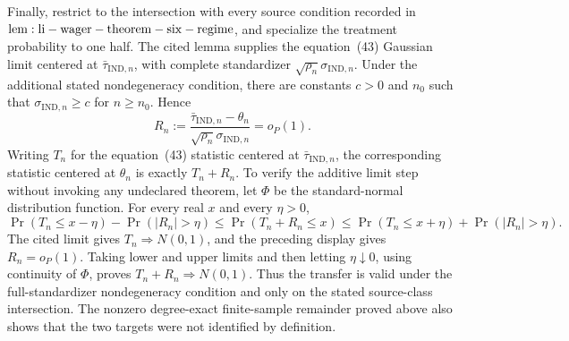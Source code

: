 Finally, restrict to the intersection with every source condition recorded in \({\rm lem:li-wager-theorem-six-regime}\), and specialize the treatment probability to one half.  The cited lemma supplies the equation~(43) Gaussian limit centered at \(\bar\tau_{\mathrm{IND},n}\), with complete standardizer \(\sqrt{\rho_n}\sigma_{\mathrm{IND},n}\).  Under the additional stated nondegeneracy condition, there are constants \(c>0\) and \(n_0\) such that \(\sigma_{\mathrm{IND},n}\ge c\) for \(n\ge n_0\).  Hence
\[
 R_n:=\frac{\bar\tau_{\mathrm{IND},n}-\theta_n}
 {\sqrt{\rho_n}\sigma_{\mathrm{IND},n}}=o_P(1).
\]
Writing \(T_n\) for the equation~(43) statistic centered at \(\bar\tau_{\mathrm{IND},n}\), the corresponding statistic centered at \(\theta_n\) is exactly \(T_n+R_n\).  To verify the additive limit step without invoking any undeclared theorem, let \(\Phi\) be the standard-normal distribution function.  For every real \(x\) and every \(\eta>0\),
\[
 \Pr(T_n\le x-\eta)-\Pr(|R_n|>\eta)
 \le\Pr(T_n+R_n\le x)
 \le\Pr(T_n\le x+\eta)+\Pr(|R_n|>\eta).
\]
The cited limit gives \(T_n\Rightarrow N(0,1)\), and the preceding display gives \(R_n=o_P(1)\).  Taking lower and upper limits and then letting \(\eta\downarrow0\), using continuity of \(\Phi\), proves \(T_n+R_n\Rightarrow N(0,1)\).  Thus the transfer is valid under the full-standardizer nondegeneracy condition and only on the stated source-class intersection.  The nonzero degree-exact finite-sample remainder proved above also shows that the two targets were not identified by definition.